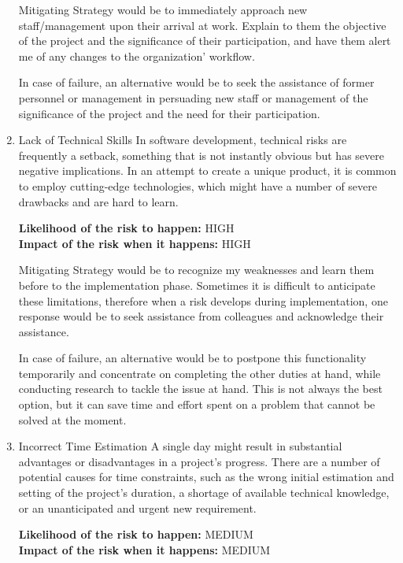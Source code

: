 \begin{justify}
\begin{enumerate}
    \newendline Mitigating Strategy would be to immediately approach new staff/management upon their arrival at work. Explain to them the objective of the project and the significance of their participation, and have them alert me of any changes to the organization' workflow.

    \newendline In case of failure, an alternative would be to seek the assistance of former personnel or management in persuading new staff or management of the significance of the project and the need for their participation.\newendline

    \item Lack of Technical Skills
    \newendline In software development, technical risks are frequently a setback, something that is not instantly obvious but has severe negative implications. In an attempt to create a unique product, it is common to employ cutting-edge technologies, which might have a number of severe drawbacks and are hard to learn.

    \newendline \textbf{\textcolor{vin}{Likelihood of the risk to happen:}} HIGH\\
    \textbf{\textcolor{vin}{Impact of the risk when it happens:}} HIGH

    \newendline Mitigating Strategy would be to recognize my weaknesses and learn them before to the implementation phase. Sometimes it is difficult to anticipate these limitations, therefore when a risk develops during implementation, one response would be to seek assistance from colleagues and acknowledge their assistance.

    \newendline In case of failure, an alternative would be to postpone this functionality temporarily and concentrate on completing the other duties at hand, while conducting research to tackle the issue at hand. This is not always the best option, but it can save time and effort spent on a problem that cannot be solved at the moment.\newendline

    \item Incorrect Time Estimation
    \newendline A single day might result in substantial advantages or disadvantages in a project’s progress. There are a number of potential causes for time constraints, such as the wrong initial estimation and setting of the project's duration, a shortage of available technical knowledge, or an unanticipated and urgent new requirement.

    \newendline \textbf{\textcolor{vin}{Likelihood of the risk to happen:}} MEDIUM\\
    \textbf{\textcolor{vin}{Impact of the risk when it happens:}} MEDIUM


\end{enumerate}
\end{justify}
